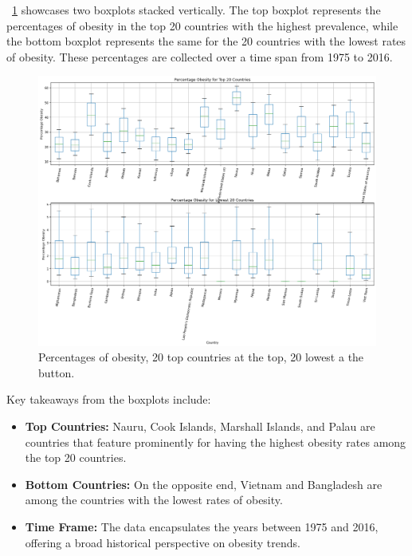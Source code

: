             \figurename~\ref{fig:du-obesity-per-obe-countries-top-lw-20} showcases two boxplots stacked vertically. The top boxplot represents the percentages of obesity in the top 20 countries with the highest prevalence, while the bottom boxplot represents the same for the 20 countries with the lowest rates of obesity. These percentages are collected over a time span from 1975 to 2016.

            \begin{figure}[H]
                \centering
                \includegraphics[scale=0.4]{images/du_obesity_pe_ob_cou_t_l_20}
                \caption{Percentages of obesity, 20 top countries at the top, 20 lowest a the button.}
                \label{fig:du-obesity-per-obe-countries-top-lw-20}
            \end{figure}

            Key takeaways from the boxplots include:

            \begin{itemize}
                \item \textbf{Top Countries:} Nauru, Cook Islands, Marshall Islands, and Palau are countries that feature prominently for having the highest obesity rates among the top 20 countries.

                \item \textbf{Bottom Countries:} On the opposite end, Vietnam and Bangladesh are among the countries with the lowest rates of obesity.

                \item \textbf{Time Frame:} The data encapsulates the years between 1975 and 2016, offering a broad historical perspective on obesity trends.
            \end{itemize}

